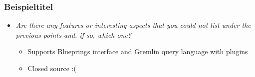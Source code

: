 
\begin{frame}
\frametitle{Beispieltitel}
\begin{itemize}
\item \emph{Are there any features or interesting aspects that you could not list under the previous points and, if so, which one?}
\begin{itemize}
	\item Supports Blueprings interface and Gremlin query language with plugins
	\item Closed source :(
\end{itemize}
\end{itemize}
\end{frame} 